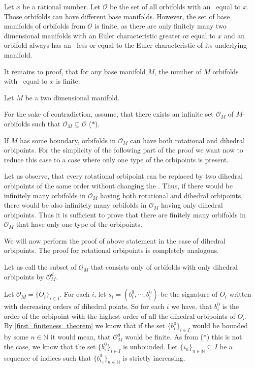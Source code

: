 Let $x$ be a rational number. 
Let $\mathcal{O}$ be the set of all orbifolds with 
an \Eoc\ equal to $x$. 
Those orbifolds can have different base manifolds. However, the set of base manifolds of 
orbifolds from $\mathcal{O}$ is finite, as there are only finitely many 
two dimensional manifolds with an Euler characteristic greater or equal to $x$ and an 
orbifold always has 
an \Eoc\ less or equal to the Euler characteristic of its underlying manifold. 

It remains to proof, that for any base manifold $M$, the number of $M$ orbifolds 
with \Eoc\ equal to $x$ is finite: 

Let $M$ be a two dimensional manifold. 

For the sake of contradiction, assume, that there exists an infinite set $\mathcal{O}_M$
of $M$-orbifolds such that $\mathcal{O}_M \subseteq \mathcal{O}$ ($\ast$).

If $M$ has some boundary, orbifolds in $\mathcal{O}_M$ 
can have both rotational and dihedral orbipoints. 
For the simplicity of the following part of the proof we want now to reduce this case 
to a case 
where only one type of the orbipoints is present. 

Let us observe, that every rotational orbipoint can be replaced by two dihedral orbipoints 
of the same order without changing the \Eoc. Thus, if there would be infinitely many 
orbifolds in $\mathcal{O}_M$ having both rotational and dihedral orbipoints, there would be 
also infinitely many orbifolds in $\mathcal{O}_M$ having only dihedral orbipoints. 
Thus it is sufficient to prove that there are finitely many orbifolds in $\mathcal{O}_M$ 
that have only one type of the orbipoints. 

We will now perform the proof of above statement in the case of dihedral orbipoints.
The proof for rotational orbipoints is completely analogous. 

Let us call the subset of $\mathcal{O}_M$ 
that consists only of orbifolds with only dihedral orbipoints by $\mathcal{O}_M^d$.

Let $\mathcal{O}_M = \{O_i\}_{i \in I}$. 
For each $i$, let $s_i = (b^0_i, \cdots, b^{l_i}_i)$ be the signature 
of $O_i$ written with decreasing orders of 
dihedral points. So for each $i$ we have, that $b^0_i$ is 
the order of the orbipoint with the highest order of all the dihedral orbipoints of 
$O_i$. 
By \ref{first_finiteness_theorem} we know that if the set $\{b^0_i\}_{i \in I}$ 
would be bounded 
by some $n \in \mathbb{N}$ it would mean, that $\mathcal{O}_M^d$ would be finite. As 
from ($\ast$) this is not the case, we know
that the set $\{b^0_i\}_{i \in I}$ is unbounded. 
Let $\{i_n\}_{n\in \mathbb{N}} \subseteq I$ be a sequence of indices such that
$\{b^0_{i_n}\}_{n\in \mathbb{N}}$ is strictly increasing. 

